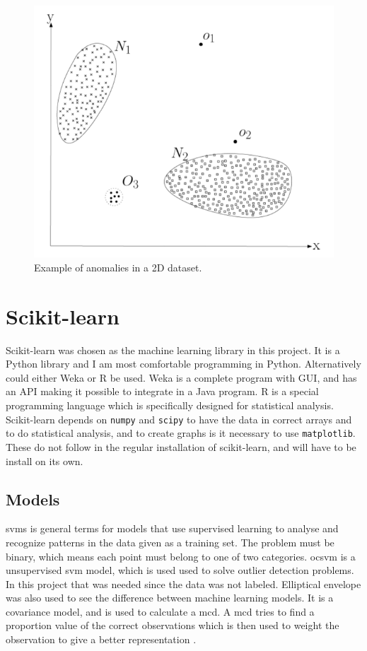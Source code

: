 \begin{figure}
\centering
\includegraphics[scale=0.3]{figs/anomaly_example.png}
\caption{\label{fig:anomalyExample}Example of anomalies in a 2D dataset\citep{chandola2009anomaly}.}
\end{figure}



\section{Scikit-learn}
Scikit-learn was chosen as the machine learning library in this project. It is a Python library and I am most comfortable programming in Python. Alternatively could either Weka or R be used. Weka is a complete program with GUI, and has an API making it possible to integrate in a Java program. R is a special programming language which is specifically designed for statistical analysis. Scikit-learn depends on \texttt{numpy} and \texttt{scipy} to have the data in correct arrays and to do statistical analysis, and to create graphs is it necessary to use \texttt{matplotlib}. These do not follow in the regular installation of scikit-learn, and will have to be install on its own. 

\subsection{Models}
\glspl{svm} is general terms for models that use supervised learning to analyse and recognize patterns in the data given as a training set. The problem must be binary, which means each point must belong to one of two categories. \gls{ocsvm} is a unsupervised \gls{svm} model, which is used used to solve outlier detection problems. In this project that was needed since the data was not labeled. Elliptical envelope was also used to see the difference between machine learning models. It is a covariance model, and is used to calculate a \gls{mcd}. A \gls{mcd} tries to find a proportion value of the correct observations which is then used to weight the observation to give a better representation \cite{scikit-learn}. 
